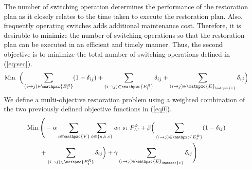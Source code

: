 \documentclass[12pt]{article}
\begin{document}
The number of switching operation determines the performance of the restoration plan as it closely relates to the time taken to execute the restoration plan. Also, frequently operating switches adds additional maintenance cost. Therefore, it is desirable to minimize the number of switching operations so that the restoration plan can be executed in an efficient and timely manner. Thus, the second objective is to minimize the total number of switching operations defined in (\ref{eq:sec}).
          \begin{equation}\label{eq:sec}
     \small
    \text{Min.   } \Big(\sum_{(i\to j)\in \mathpzc{E_s^R}}(1-\delta_{ij})+\sum_{(i\to j)\in \mathpzc{E_t^R}}\delta_{ij} +\sum\limits_{(i\rightarrow j) \in  \mathpzc{E}_\mathpzc{v}} \delta_{ij}   \Big)
     \end{equation}
We define a multi-objective restoration problem using a weighted combination of the two previously defined objective functions in (\ref{eq0}). 
\begin{eqnarray} \label{eq0}
\small
\begin{aligned}
\text{Min.}& \Bigg(-\alpha \sum_{i\in  \mathpzc{V}}\sum_{\phi\in\{a,b,c\}}w_i\ s_i \ P_{Li}^{\phi}+\beta \Big(\sum_{(i\to j)\in \mathpzc{E_s^R}}(1-\delta_{ij})\\
&+\sum_{(i\to j)\in \mathpzc{E_t^R}}\delta_{ij}\Big) +\gamma\sum\limits_{(i\rightarrow j) \in  \mathpzc{E}_\mathpzc{v}} \delta_{ij}   \Bigg)
\end{aligned}
\end{eqnarray}
 
\end{document}
